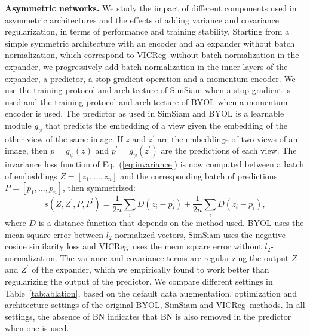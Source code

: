 \documentclass{article}
\newcommand{\algo}{VICReg}
\newcommand{\expander}{expander }
\newcommand{\expandernospace}{expander}
\begin{document}
\vspace{2mm}
\textbf{Asymmetric networks.} \label{sec:ablation_asymetric} We study the impact of different components used in asymmetric architectures and the effects of adding variance and covariance regularization, in terms of performance and training stability. Starting from a simple symmetric architecture with an encoder and an \expander without batch normalization, which correspond to \algo \ without batch normalization in the \expandernospace, we progressively add batch normalization in the inner layers of the \expandernospace, a predictor, a stop-gradient operation and a momentum encoder. We use the training protocol and architecture of SimSiam \cite{chen2020simsiam} when a stop-gradient is used and the training protocol and architecture of BYOL \cite{grill2020byol} when a momentum encoder is used. The predictor as used in SimSiam and BYOL is a learnable module $g_{\psi}$ that predicts the embedding of a view given the embedding of the other view of the same image. If $z$ and $z^{\prime}$ are the embeddings of two views of an image, then $p = g_{\psi}(z)$ and $p^{\prime} = g_{\psi}(z^{\prime})$ are the predictions of each view. The invariance loss function of Eq.~(\ref{eq:invariance}) is now computed between a batch of embeddings $Z = [z_1, \dots, z_n]$ and the corresponding batch of predictions $P = [p_1^{\prime}, \dots, p_n^{\prime}]$, then symmetrized:
\begin{equation}
    s(Z, Z^{\prime}, P, P^{\prime}) = \frac{1}{2n} \sum_i D(z_i - p^{\prime}_i) + \frac{1}{2n} \sum_i D(z^{\prime}_i - p_i),
\end{equation}
where $D$ is a distance function that depends on the method used. BYOL uses the mean square error between $l_2$-normalized vectors, SimSiam uses the negative cosine similarity loss and \algo \ uses the mean square error without $l_2$-normalization. The variance and covariance terms are regularizing the output $Z$ and $Z^{\prime}$ of the \expandernospace, which we empirically found to work better than regularizing the output of the predictor. We compare different settings in Table~\ref{tab:ablation}, based on the default data augmentation, optimization and architecture settings of the original BYOL, SimSiam and \algo \ methods. In all settings, the absence of BN indicates that BN is also removed in the predictor when one is used.
\end{document}

